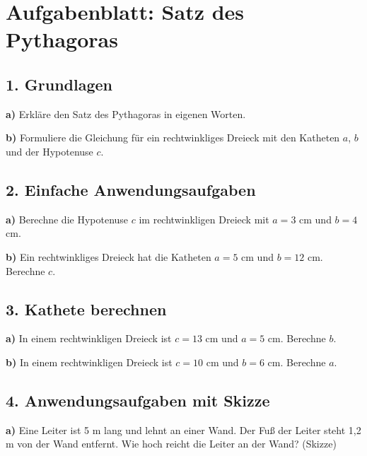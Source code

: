 
\section*{Aufgabenblatt: Satz des Pythagoras}

\subsection*{1. Grundlagen}
\textbf{a)} Erkläre den Satz des Pythagoras in eigenen Worten.

\textbf{b)} Formuliere die Gleichung für ein rechtwinkliges Dreieck mit den Katheten $a$, $b$ und der Hypotenuse $c$.

\subsection*{2. Einfache Anwendungsaufgaben}
\textbf{a)} Berechne die Hypotenuse $c$ im rechtwinkligen Dreieck mit $a = 3$ cm und $b = 4$ cm.

\begin{center}
\end{center}

\textbf{b)} Ein rechtwinkliges Dreieck hat die Katheten $a = 5$ cm und $b = 12$ cm. Berechne $c$.

\vspace{0.5cm}

\subsection*{3. Kathete berechnen}
\textbf{a)} In einem rechtwinkligen Dreieck ist $c = 13$ cm und $a = 5$ cm. Berechne $b$.

\textbf{b)} In einem rechtwinkligen Dreieck ist $c = 10$ cm und $b = 6$ cm. Berechne $a$.

\vspace{0.5cm}

\subsection*{4. Anwendungsaufgaben mit Skizze}
\textbf{a)} Eine Leiter ist 5 m lang und lehnt an einer Wand. Der Fuß der Leiter steht 1,2 m von der Wand entfernt. Wie hoch reicht die Leiter an der Wand? (Skizze)


